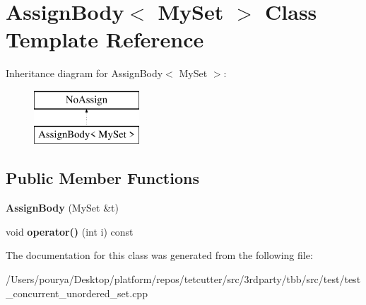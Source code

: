 \hypertarget{classAssignBody_3_01MySet_01_4}{}\section{Assign\+Body$<$ My\+Set $>$ Class Template Reference}
\label{classAssignBody_3_01MySet_01_4}
Inheritance diagram for Assign\+Body$<$ My\+Set $>$\+:\begin{figure}[H]
\begin{center}
\leavevmode
\includegraphics[height=2.000000cm]{classAssignBody_3_01MySet_01_4}
\end{center}
\end{figure}
\subsection*{Public Member Functions}
\begin{DoxyCompactItemize}
\item 
\hypertarget{classAssignBody_3_01MySet_01_4_aee0c91fa313362b03ed4dfbd3eccb7cf}{}{\bfseries Assign\+Body} (My\+Set \&t)\label{classAssignBody_3_01MySet_01_4_aee0c91fa313362b03ed4dfbd3eccb7cf}

\item 
\hypertarget{classAssignBody_3_01MySet_01_4_ae55dc261a36fd4cd20070f889aaedf95}{}void {\bfseries operator()} (int i) const \label{classAssignBody_3_01MySet_01_4_ae55dc261a36fd4cd20070f889aaedf95}

\end{DoxyCompactItemize}


The documentation for this class was generated from the following file\+:\begin{DoxyCompactItemize}
\item 
/\+Users/pourya/\+Desktop/platform/repos/tetcutter/src/3rdparty/tbb/src/test/test\+\_\+concurrent\+\_\+unordered\+\_\+set.\+cpp\end{DoxyCompactItemize}
